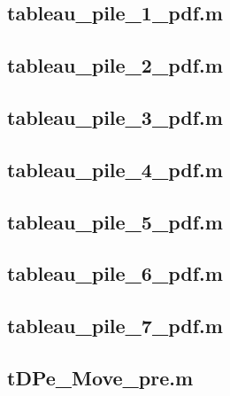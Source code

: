 \documentclass[runningheads,a4paper]{llncs}
\newcommand{\GPenSIM}{../GPenSIM}
\begin{document}
\subsection{tableau\_pile\_1\_pdf.m}
\label{app:tableau_pile_1_pdf}


\subsection{tableau\_pile\_2\_pdf.m}
\label{app:tableau_pile_2_pdf}


\subsection{tableau\_pile\_3\_pdf.m}
\label{app:tableau_pile_3_pdf}


\subsection{tableau\_pile\_4\_pdf.m}
\label{app:tableau_pile_4_pdf}


\subsection{tableau\_pile\_5\_pdf.m}
\label{app:tableau_pile_5_pdf}


\subsection{tableau\_pile\_6\_pdf.m}
\label{app:tableau_pile_6_pdf}


\subsection{tableau\_pile\_7\_pdf.m}
\label{app:tableau_pile_7_pdf}


\subsection{tDPe\_Move\_pre.m}
\label{app:tDPe_Move_pre}

\end{document}
